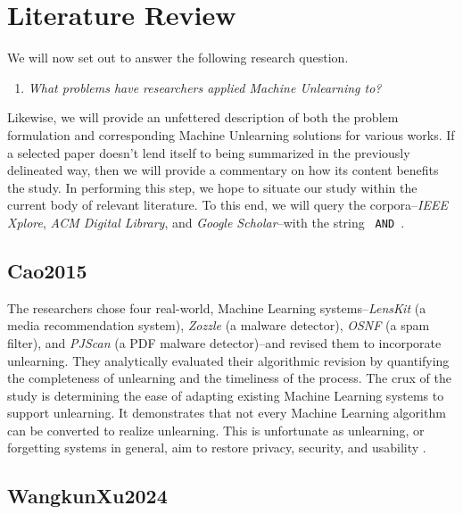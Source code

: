 \section{Literature Review}
\label{sec:Literature_Review}

    We will now set out to answer the following research question. 
    
    \begin{enumerate}[label=\textbf{RQ\arabic*}:, left=2em]
        \item \textit{What problems have researchers applied Machine Unlearning to?}
    \end{enumerate}
    
    Likewise, we will provide an unfettered description of both the problem formulation and corresponding Machine Unlearning solutions for various works. If a selected paper doesn't lend itself to being summarized in the previously delineated way, then we will provide a commentary on how its content benefits the study. In performing this step, we hope to situate our study within the current body of relevant literature. To this end, we will query the corpora--\textit{IEEE Xplore}, \textit{ACM Digital Library}, and \textit{Google Scholar}--with the string \texttt{ AND }.
    
    \subsection{Cao2015}
    \label{subsec:Cao2015}
    
        The researchers chose four real-world, Machine Learning systems--\textit{LensKit} (a media recommendation system), \textit{Zozzle} (a malware detector), \textit{OSNF} (a spam filter), and \textit{PJScan} (a PDF malware detector)--and revised them to incorporate unlearning. They analytically evaluated their algorithmic revision by quantifying the completeness of unlearning and the timeliness of the process. The crux of the study is determining the ease of adapting existing Machine Learning systems to support unlearning. It demonstrates that not every Machine Learning algorithm can be converted to realize unlearning. This is unfortunate as unlearning, or forgetting systems in general, aim to restore privacy, security, and usability \cite{Cao2015}.
    
    \subsection{WangkunXu2024}
    \label{subsec:WangkunXu2024}
    
